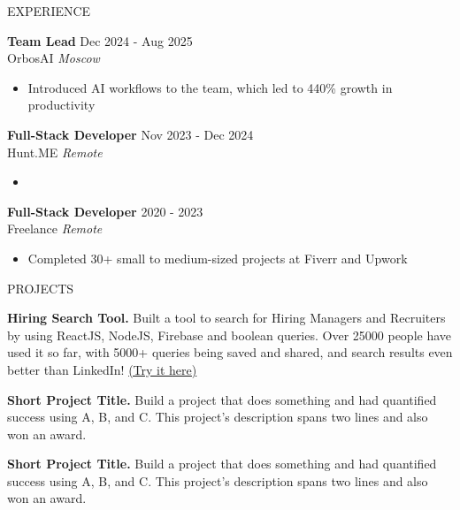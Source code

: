 \documentclass{resume} %
\begin{document}
\begin{rSection}{EXPERIENCE}

\textbf{Team Lead} \hfill Dec 2024 - Aug 2025 \\
OrbosAI \hfill \textit{Moscow}
 \begin{itemize}
    \itemsep -3pt {} 
    \item Introduced AI workflows to the team, which led to 440\% growth in productivity
 \end{itemize}
 

\textbf{Full-Stack Developer} \hfill Nov 2023 - Dec 2024\\
Hunt.ME \hfill \textit{Remote}
 \begin{itemize}
    \itemsep -3pt {} 
     \item 
 \end{itemize}

 \textbf{Full-Stack Developer} \hfill 2020 - 2023\\
Freelance \hfill \textit{Remote}
 \begin{itemize}
    \itemsep -3pt {} 
     \item Completed 30+ small to medium-sized projects at Fiverr and Upwork
 \end{itemize}

\end{rSection} 


\begin{rSection}{PROJECTS}
\vspace{-1.25em}
\item \textbf{Hiring Search Tool.} {Built a tool to search for Hiring Managers and Recruiters by using ReactJS, NodeJS, Firebase and boolean queries. Over 25000 people have used it so far, with 5000+ queries being saved and shared, and search results even better than LinkedIn! \href{https://hiring-search.careerflow.ai/}{(Try it here)}}
\item \textbf{Short Project Title.} {Build a project that does something and had quantified success using A, B, and C. This project's description spans two lines and also won an award.}
\item \textbf{Short Project Title.} {Build a project that does something and had quantified success using A, B, and C. This project's description spans two lines and also won an award.}
\end{rSection} 
\end{document}
